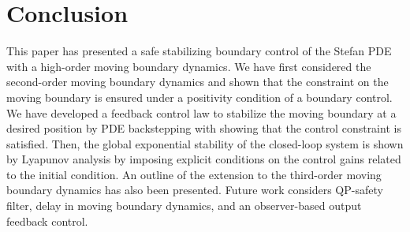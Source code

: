 \documentclass[letterpaper, 10 pt, conference]{cls/ieeeconf}
\theoremstyle{definition}
\newcommand{\ep}{\varepsilon}
\begin{document}
    
\section{Conclusion} \label{sec:conclusion}

This paper has presented a safe stabilizing boundary control of the Stefan PDE with a high-order moving boundary dynamics. 
We have first considered the second-order moving boundary dynamics and shown that the constraint on the moving boundary is ensured under a positivity condition of a boundary control. 
We have developed a feedback control law to stabilize the moving boundary at a desired position by PDE backstepping with showing that the control constraint is satisfied. 
Then, the global exponential stability of the closed-loop system is shown by Lyapunov analysis by imposing explicit conditions on the control gains related to the initial condition. 
An outline of the extension to the third-order moving boundary dynamics has also been presented. Future work considers QP-safety filter, delay in moving boundary dynamics, and an observer-based output feedback control. 
\end{document}
